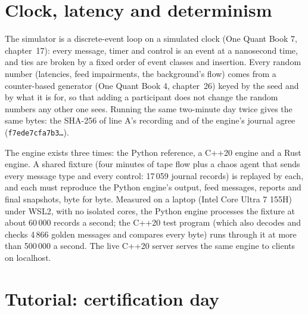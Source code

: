 \section{Clock, latency and determinism}

The simulator is a discrete-event loop on a simulated clock (One Quant Book 7, chapter~17): every message, timer and control is an event at a nanosecond
time, and ties are broken by a fixed order of event classes and insertion. Every random number (latencies, feed impairments, the background's flow) comes
from a counter-based generator (One Quant Book 4, chapter~26) keyed by the seed and by what it is for, so that adding a participant does not change the
random numbers any other one sees. Running the same two-minute day twice gives the same bytes: the SHA-256 of line A's recording and of the engine's
journal agree (\texttt{f7ede7cfa7b3\dots}).

The engine exists three times: the Python reference, a C++20 engine and a Rust engine. A shared fixture (four minutes of tape flow plus a chaos agent
that sends every message type and every control: 17\,059 journal records) is replayed by each, and each must reproduce the Python engine's output, feed
messages, reports and final snapshots, byte for byte. Measured on a laptop (Intel Core Ultra 7 155H) under WSL2, with no isolated cores, the Python
engine processes the fixture at about 60\,000 records a second; the C++20 test program (which also decodes and checks 4\,866 golden messages and compares
every byte) runs through it at more than 500\,000 a second. The live C++20 server serves the same engine to clients on localhost.

\section{Tutorial: certification day}\label{tut:mx:build-a-matching-engine-and-exchange-simulator:tut}

